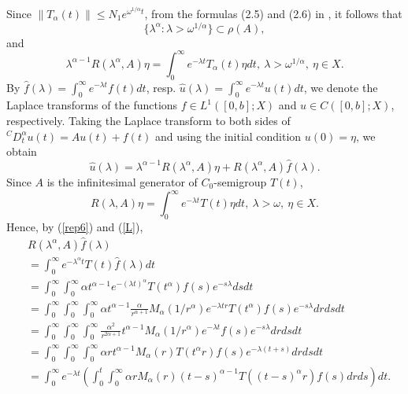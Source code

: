 \documentclass[12pt,a4paper,oneside,reqno,notitlepage]{amsart}
\theoremstyle{plain}
\numberwithin{equation}{section}
\begin{document}
Since $\|T_{\alpha}(t)\|\leq N_{1}e^{\omega^{1/\alpha}t}$, from the formulas (2.5) and (2.6) in \cite{Bazhlekova}, it follows that
\begin{equation}\label{rep3}
\{\lambda^{\alpha}:\lambda>\omega^{1/\alpha}\}\subset \rho(A),
\end{equation}
and
\begin{equation}\label{rep4}
\lambda^{\alpha-1}R(\lambda^{\alpha},A)\eta=\int_{0}^{\infty}e^{-\lambda t}T_{\alpha}(t)\eta dt,\ \lambda>\omega^{1/\alpha},\ \eta\in X.
\end{equation}
By $\widehat{f}(\lambda)=\int_{0}^{\infty}e^{-\lambda t}f(t)dt$, resp. $\widehat{u}(\lambda)=\int_{0}^{\infty}e^{-\lambda t}u(t)dt$, we denote the Laplace transforms of the functions $f\in L^{1}([0,b];X)$ and $u\in C([0,b];X)$, respectively.
Taking the Laplace transform to both sides of $^{C}D_{t}^{\alpha}u(t)=Au(t)+f(t)$ and using the initial condition $u(0)=\eta$, we obtain
\begin{equation}\label{rep5}
\widehat{u}(\lambda)=\lambda^{\alpha-1}R(\lambda^{\alpha},A)\eta+R(\lambda^{\alpha},A)\widehat{f}(\lambda).
\end{equation}
Since $A$ is the infinitesimal generator of $C_{0}$-semigroup $T(t)$,
\begin{equation}\label{rep6}
R(\lambda,A)\eta=\int_{0}^{\infty}e^{-\lambda t}T(t)\eta dt,\ \lambda>\omega,\ \eta\in X.
\end{equation}
Hence, by (\ref{rep6}) and (\ref{L}),
\begin{align}\label{transfer}
&R(\lambda^{\alpha},A)\widehat{f}(\lambda)\\
&=\int_{0}^{\infty}e^{-\lambda^{\alpha}t}T(t)\widehat{f}(\lambda)dt\nonumber\\
&=\int_{0}^{\infty}\int_{0}^{\infty}\alpha t^{\alpha-1}e^{-(\lambda t)^{\alpha}}T(t^{\alpha})f(s)e^{-s\lambda}dsdt\nonumber\\
&=\int_{0}^{\infty}\int_{0}^{\infty}\int_{0}^{\infty}\alpha t^{\alpha-1}\frac{\alpha}{r^{\alpha+1}}M_{\alpha}(1/r^{\alpha})e^{-\lambda tr}T(t^{\alpha})f(s)e^{-s\lambda}drdsdt\nonumber\\
&=\int_{0}^{\infty}\int_{0}^{\infty}\int_{0}^{\infty}\frac{\alpha^{2}}{r^{2\alpha+1}}t^{\alpha-1}M_{\alpha}(1/r^{\alpha})e^{-\lambda t}f(s)e^{-s\lambda}drdsdt\nonumber\\
&=\int_{0}^{\infty}\int_{0}^{\infty}\int_{0}^{\infty}\alpha rt^{\alpha-1}M_{\alpha}(r)T(t^{\alpha}r)f(s)e^{-\lambda(t+s)}drdsdt\nonumber\\
&=\int_{0}^{\infty}e^{-\lambda t}\left(\int_{0}^{t}\int_{0}^{\infty}\alpha rM_{\alpha}(r)(t-s)^{\alpha-1}T((t-s)^{\alpha}r)f(s)drds\right)dt.
\end{align}
\end{document}
